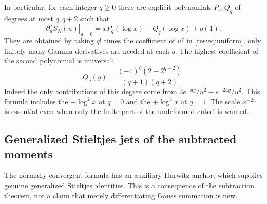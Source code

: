 In particular, for each integer $q\geq0$ there are explicit
polynomials $P_q,Q_q$ of degrees at most $q,q+2$ such that
\begin{equation}
 \left.\partial_u^q S_N(u)\right|_{u=0}
       =xP_q(\log x)+Q_q(\log x)+o(1).
 \label{res:eq:all-cutoff-jets}
\end{equation}
They are obtained by taking $q!$ times the coefficient of $u^q$
in \eqref{res:eq:uniform}; only finitely many Gamma derivatives
are needed at each $q$.  The highest coefficient of the second
polynomial is universal:
\begin{equation}
 [y^{q+2}]Q_q(y)
   =\frac{(-1)^q(2-2^{q+2})}{(q+1)(q+2)}.
 \label{res:eq:universal-log}
\end{equation}
Indeed the only contributions of this degree come from
$2e^{-uy}/u^2-e^{-2uy}/u^2$.  This formula includes the
$-\log^2x$ at $q=0$ and the $+\log^3x$ at $q=1$.
The scale $x^{-2u}$ is essential even when only the finite
part of the undeformed cutoff is wanted.

\subsection{Generalized Stieltjes jets of the subtracted moments}
The normally convergent formula has an auxiliary Hurwitz anchor,
which supplies genuine generalized Stieltjes identities.  This is
a consequence of the subtraction theorem, not a claim that merely
differentiating Gauss summation is new.


